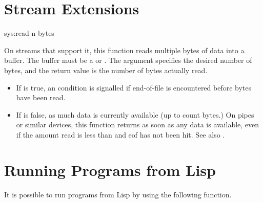 \section{Stream Extensions}
\begin{defun}{sys:}{read-n-bytes}{%
    }
  
  On streams that support it, this function reads multiple bytes of
  data into a buffer.  The buffer must be a  or
  .  The argument
   specifies the desired number of bytes, and the return
  value is the number of bytes actually read.
  \begin{itemize}
  \item If  is true, an 
    condition is signalled if end-of-file is encountered before
     bytes have been read.
    
  \item If  is false,  as
    much data is currently available (up to count bytes.)  On pipes or
    similar devices, this function returns as soon as any data is
    available, even if the amount read is less than  and
    eof has not been hit.  See also .
  \end{itemize}
\end{defun}



\section{Running Programs from Lisp}

It is possible to run programs from Lisp by using the following function.

